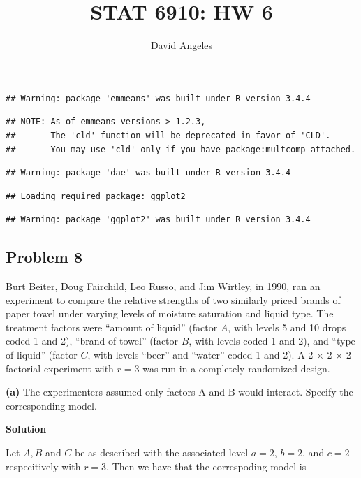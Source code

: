 \documentclass[12pt,]{article}
\title{STAT 6910: HW 6}
\author{David Angeles}
\date{}
\begin{document}
\maketitle

\begin{verbatim}
## Warning: package 'emmeans' was built under R version 3.4.4
\end{verbatim}

\begin{verbatim}
## NOTE: As of emmeans versions > 1.2.3,
##       The 'cld' function will be deprecated in favor of 'CLD'.
##       You may use 'cld' only if you have package:multcomp attached.
\end{verbatim}

\begin{verbatim}
## Warning: package 'dae' was built under R version 3.4.4
\end{verbatim}

\begin{verbatim}
## Loading required package: ggplot2
\end{verbatim}

\begin{verbatim}
## Warning: package 'ggplot2' was built under R version 3.4.4
\end{verbatim}

\subsection{Problem 8}\label{problem-8}

Burt Beiter, Doug Fairchild, Leo Russo, and Jim Wirtley, in 1990, ran an
experiment to compare the relative strengths of two similarly priced
brands of paper towel under varying levels of moisture saturation and
liquid type. The treatment factors were ``amount of liquid'' (factor
\(A\), with levels 5 and 10 drops coded 1 and 2), ``brand of towel''
(factor \(B\), with levels coded 1 and 2), and ``type of liquid''
(factor \(C\), with levels ``beer'' and ``water'' coded 1 and 2). A 2 ×
2 × 2 factorial experiment with \(r = 3\) was run in a completely
randomized design.

\textbf{(a)} The experimenters assumed only factors A and B would
interact. Specify the corresponding model.

\textbf{Solution}

Let \(A, B\) and \(C\) be as described with the associated level
\(a= 2\), \(b = 2\), and \(c= 2\) respecitively with \(r=3\). Then we
have that the correspoding model is
\end{document}
